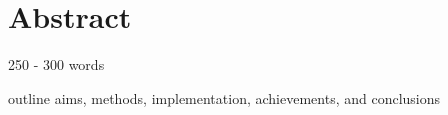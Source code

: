 \section{Abstract}
250 - 300 words

outline aims, methods, implementation, achievements, and conclusions
\pagebreak


